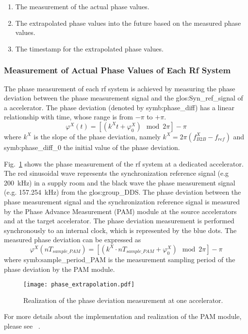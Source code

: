 \begin{enumerate}
\item The measurement of the actual phase values.
\item The extrapolated phase values into the future based on the measured phase values.
\item The timestamp for the extrapolated phase values.
\end{enumerate}


 \subsubsection{Measurement of Actual Phase Values of Each Rf System}
The phase measurement of each rf system is achieved by measuring the phase deviation between the phase measurement signal and the \gls{glos:Syn_ref_signal} of a accelerator. The phase deviation (denoted by \gls{symb:phase_diff}) has a linear relationship with time, whose range is from $-\pi$ to $+\pi$. 
\begin{equation}
\varphi^X(t)= [(k^\mathit{X}t+\varphi^X_0) \mod 2\pi] - \pi
\end{equation}
where $k^\mathit{X}$ is the slope of the phase deviation, namely $k^\mathit{X}=2\pi(f_\mathit{B2B}^{X}-f_\mathit{ref})$ and \gls{symb:phase_diff_0} the initial value of the phase deviation.

Fig.~\ref{phase_prediction} shows the phase measurement of the rf system at a dedicated accelerator. The red sinusoidal wave represents the synchronization reference signal (e.g \SI{200}{kHz}) in a supply room and the black wave the phase measurement signal (e.g. \SI{157.254}{kHz}) from the \gls{glos:group_DDS}. The phase deviation between the phase measurement signal and the synchronization reference signal is measured by the Phase Advance Measurement (\gls{PAM}) module at the source accelerators and at the target accelerator. The phase deviation measurement is performed synchronously to an internal clock, which is represented by the blue dots. The measured phase deviation can be expressed as
\begin{equation}
\varphi^X(nT_\mathit{sample\_PAM})=[( k^\mathit{X}\cdot nT_\mathit{sample\_PAM}+\varphi^X_0) \mod 2\pi ]-\pi
\end{equation}
where \gls{symb:sample_period_PAM} is the measurement sampling period of the phase deviation by the PAM module.
\begin{figure}[H]
   \centering   
   \texttt{[image: phase\_extrapolation.pdf]}
   \caption{Realization of the phase deviation measurement at one accelerator.}
   \label{phase_prediction}
\end{figure}
For more details about the implementation and realization of the PAM module, please see ~\cite{ferrand_development_nodate}. 
